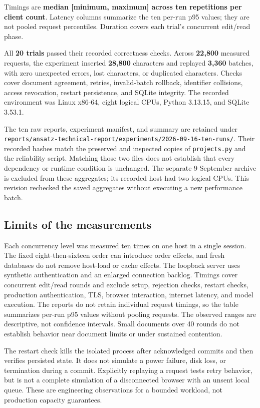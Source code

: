 \documentclass[10pt,letterpaper]{article}
\begin{document}
Timings are \textbf{median [minimum, maximum] across ten repetitions per client count}. Latency columns summarize the ten per-run p95 values; they are not pooled request percentiles. Duration covers each trial's concurrent edit/read phase.

All \textbf{20 trials} passed their recorded correctness checks. Across \textbf{22,800} measured requests, the experiment inserted \textbf{28,800} characters and replayed \textbf{3,360} batches, with zero unexpected errors, lost characters, or duplicated characters. Checks cover document agreement, retries, invalid-batch rollback, identifier collisions, access revocation, restart persistence, and SQLite integrity. The recorded environment was Linux x86-64, eight logical CPUs, Python 3.13.15, and SQLite 3.53.1.

The ten raw reports, experiment manifest, and summary are retained under \nolinkurl{reports/ansatz-technical-report/experiments/2026-09-16-ten-runs/}. Their recorded hashes match the preserved and inspected copies of \nolinkurl{projects.py} and the reliability script. Matching those two files does not establish that every dependency or runtime condition is unchanged. The separate 9 September archive is excluded from these aggregates; its recorded host had two logical CPUs. This revision rechecked the saved aggregates without executing a new performance batch.

\subsection{Limits of the measurements}

Each concurrency level was measured ten times on one host in a single session. The fixed eight-then-sixteen order can introduce order effects, and fresh databases do not remove host-load or cache effects. The loopback server uses synthetic authentication and an enlarged connection backlog. Timings cover concurrent edit/read rounds and exclude setup, rejection checks, restart checks, production authentication, TLS, browser interaction, internet latency, and model execution. The reports do not retain individual request timings, so the table summarizes per-run p95 values without pooling requests. The observed ranges are descriptive, not confidence intervals. Small documents over 40 rounds do not establish behavior near document limits or under sustained contention.

The restart check kills the isolated process after acknowledged commits and then verifies persisted state. It does not simulate a power failure, disk loss, or termination during a commit. Explicitly replaying a request tests retry behavior, but is not a complete simulation of a disconnected browser with an unsent local queue. These are engineering observations for a bounded workload, not production capacity guarantees.
\end{document}

